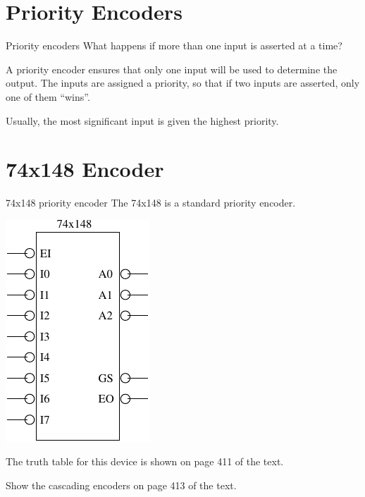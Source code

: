 \section{Priority Encoders}

\begin{frame}{Priority encoders}
  What happens if more than one input is asserted at a time?
  \begin{definition}
    A \alert{priority encoder} ensures that only one input will be used to determine the output.  The inputs are assigned a priority, so that if two inputs are asserted, only one of them ``wins''.
  \end{definition}
  Usually, the most significant input is given the highest priority.
\end{frame}

\section{74x148 Encoder}

\begin{frame}{74x148 priority encoder}
  The 74x148 is a standard priority encoder.\\
  \begin{center}
    \includegraphics{74x148Schematic}
  \end{center}
  The truth table for this device is shown on page 411 of the text.
\end{frame}

Show the cascading encoders on page 413 of the text.


